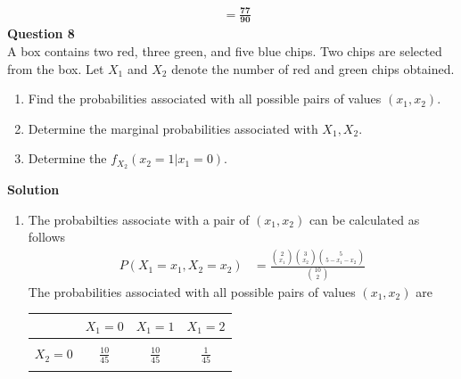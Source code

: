 \documentclass{uofa-eng-assignment}
\begin{document}
\begin{enumerate}
\begin{align*}
                        & = \boldsymbol{\frac{77}{90}}
        \end{align*}
        \textbf{Question 8} \\
        A box contains two red, three green, and five blue chips. Two chips are selected from the box.
        Let $X_1$ and $X_2$ denote the number of red and green chips obtained.
        \begin{enumerate}
            \item Find the probabilities associated with all possible pairs of values $(x_1,
                      x_2)$.
            \item Determine the marginal probabilities associated with $X_1, X_2$.
            \item Determine the $f_{X_2}(x_2 = 1 | x_1 = 0)$.
        \end{enumerate}
        \textbf{Solution}
        \begin{enumerate}
            \item The probabilties associate with a pair of $(x_1, x_2)$ can be calculated as
                  follows
                  \begin{align*}
                      P(X_1 = x_1, X_2 = x_2) & = \frac{\binom{2}{x_1}\binom{3}{x_2}\binom{5}{5-x_1-x_2}}{\binom{10}{2}}
                  \end{align*}
                  The probabilities associated with all possible pairs of values $(x_1, x_2)$ are
                  \begin{center}
                      \begin{tabular}{|c|c|c|c|}
                          \hline
                                  & $X_1=0$         & $X_1=1$         & $X_1=2$        \\
                          \hline
                                  &                 &                 &                \\
                          $X_2=0$ & $\frac{10}{45}$ & $\frac{10}{45}$ & $\frac{1}{45}$ \\
                                  &                 &                 &                \\

\end{tabular}
\end{center}
\end{enumerate}
\end{enumerate}
\end{document}
